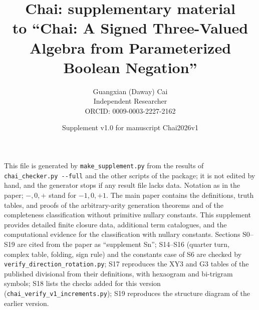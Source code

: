 \documentclass[10pt,a4paper]{article}
\title{Chai: supplementary material\\[2pt]\large to ``Chai: A Signed Three-Valued Algebra from Parameterized Boolean Negation''}\author{Guangxian (Daway) Cai\\ Independent Researcher\\ ORCID: 0009-0003-2227-2162}\date{Supplement v1.0 for manuscript Chai2026v1}
\begin{document}
\maketitle
This file is generated by \texttt{make\_supplement.py} from the results of \texttt{chai\_checker.py -{}-full} and the other scripts of the package; it is not edited by hand, and the generator stops if any result file lacks data. Notation as in the paper; $-,0,+$ stand for $-1,0,+1$. The main paper contains the definitions, truth tables, and proofs of the arbitrary-arity generation theorems and of the completeness classification without primitive nullary constants. This supplement provides detailed finite closure data, additional term catalogues, and the computational evidence for the classification with nullary constants. Sections S0--S19 are cited from the paper as ``supplement Sn''; S14--S16 (quarter turn, complex table, folding, sign rule) and the constants case of S6 are checked by \texttt{verify\_direction\_rotation.py}; S17 reproduces the XY3 and G3 tables of the published divisional from their definitions, with hexaogram and bi-trigram symbols; S18 lists the checks added for this version (\texttt{chai\_verify\_v1\_increments.py}); S19 reproduces the structure diagram of the earlier version.
\end{document}
